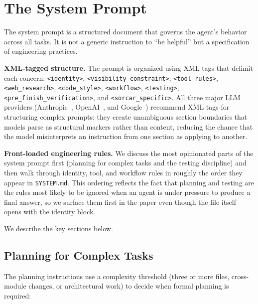\documentclass{article}
\begin{document}
\section{The System Prompt}\nopagebreak
\label{sec:system-prompt}

The system prompt is a structured document that governs the agent's behavior across all tasks.  It is not a generic instruction to ``be helpful'' but a specification of engineering practices.

\textbf{XML-tagged structure.}  The prompt is organized using XML tags that delimit each concern: \texttt{<identity>}, \texttt{<visibility\_constraint>}, \texttt{<tool\_rules>}, \texttt{<web\_research>}, \texttt{<code\_style>}, \texttt{<workflow>}, \texttt{<testing>}, \texttt{<pre\_finish\_verification>}, and \texttt{<sorcar\_specific>}.  All three major LLM providers (Anthropic~\citep{anthropic2025prompting}, OpenAI~\citep{openai2025prompting}, and Google~\citep{google2025prompting}) recommend XML tags for structuring complex prompts: they create unambiguous section boundaries that models parse as structural markers rather than content, reducing the chance that the model misinterprets an instruction from one section as applying to another.

\textbf{Front-loaded engineering rules.}  We discuss the most opinionated parts of the system prompt first (planning for complex tasks and the testing discipline) and then walk through identity, tool, and workflow rules in roughly the order they appear in \texttt{SYSTEM.md}.  This ordering reflects the fact that planning and testing are the rules most likely to be ignored when an agent is under pressure to produce a final answer, so we surface them first in the paper even though the file itself opens with the identity block.

We describe the key sections below.

\subsection{Planning for Complex Tasks}

The planning instructions use a complexity threshold (three or more files, cross-module changes, or architectural work) to decide when formal planning is required:
\end{document}
